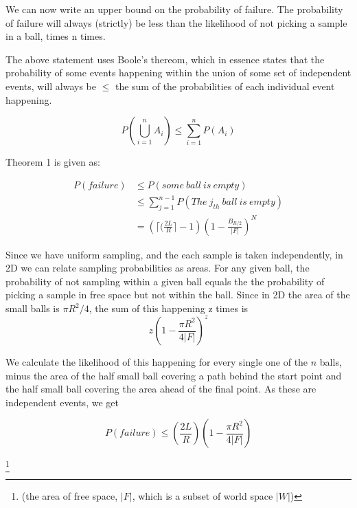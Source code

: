 \documentclass[a4paper]{article}
\begin{document}
We can now write an upper bound on the probability of failure. The probability
of failure will always (strictly) be less than the likelihood of not picking a
sample in a ball, times n times. 

The above statement uses Boole's thereom, which in essence
states that the probability of some events happening within the union of some
set of independent events, will always be $\leq$ the sum of the probabilities of
each individual event happening.


\begin{equation}
    P\left(\bigcup_{i=1}^{n}A_i\right) \leq \sum_{i=1}^{n} P(A_i)
\end{equation}

Theorem 1 is given as:

\begin{equation}
\begin{align*}
    P(failure) &\leq P(some\ ball\ is\ empty) \\
        &\leq \sum_{j=1}^{n-1} P(The\ j_{th}\ ball\ is\ empty) \\
        &= \left(\lceil(\frac{2L}{R}\rceil-1\right) \left(1-\frac{B_{R/2}}{|F|}\right)^N
\end{align*}
\end{equation}

Since we have uniform sampling, and the each sample is taken independently, in
2D we can relate sampling probabilities as areas.  For any given ball, the
probability of not sampling within a given ball equals the the probability of
picking a sample in free space but not within the ball. Since in 2D the area of the small balls is $\pi R^2 / 4$, the sum of this happening z times is 
\begin{equation}
    z \left(1 - \frac{\pi R^2}{4|F|}\right) ^z
\end {equation}

We calculate the likelihood of this happening for every single one of the $n$
    balls, minus the area of the half small ball covering a path behind the start
    point and the half small ball covering the area ahead of the final point. As these are
    independent events, we get

\begin{equation}
    P(failure) \leq \left(\frac{2L}{R}\right) \left(1 - \frac{\pi R^2}{4|F|}\right)
\end {equation}


\footnote{(the area of free space, $|F|$, which is a subset of world space
$|W|$)}
\end{document}
